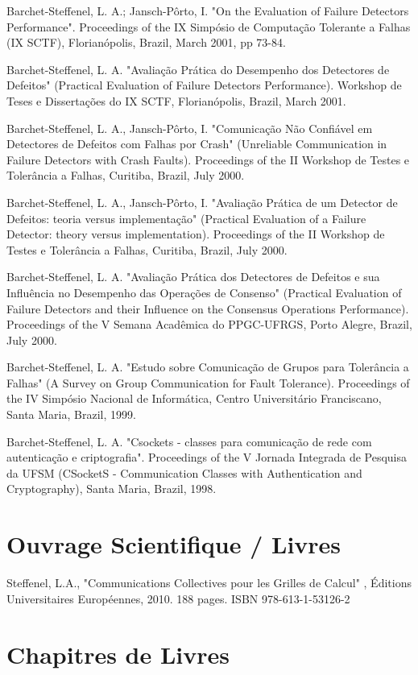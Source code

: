 \documentclass[final,twoside]{hdr} %
\begin{document}
Barchet-Steffenel, L. A.; Jansch-Pôrto, I. "On the Evaluation of Failure Detectors Performance". Proceedings of the IX Simpósio de Computação Tolerante a Falhas (IX SCTF), Florianópolis, Brazil, March 2001, pp 73-84.

Barchet-Steffenel, L. A. "Avaliação Prática do Desempenho dos Detectores de Defeitos" (Practical Evaluation of Failure Detectors Performance). Workshop de Teses e Dissertações do IX SCTF, Florianópolis, Brazil, March 2001. 

Barchet-Steffenel, L. A., Jansch-Pôrto, I. "Comunicação Não Confiável em Detectores de Defeitos com Falhas por Crash" (Unreliable Communication in Failure Detectors with Crash Faults). Proceedings of the II Workshop de Testes e Tolerância a Falhas, Curitiba, Brazil, July 2000. 

Barchet-Steffenel, L. A., Jansch-Pôrto, I. "Avaliação Prática de um Detector de Defeitos: teoria versus implementação" (Practical Evaluation of a Failure Detector: theory versus implementation). Proceedings of the II Workshop de Testes e Tolerância a Falhas, Curitiba, Brazil, July 2000. 

Barchet-Steffenel, L. A. "Avaliação Prática dos Detectores de Defeitos e sua Influência no Desempenho das Operações de Consenso" (Practical Evaluation of Failure Detectors and their Influence on the Consensus Operations Performance). Proceedings of the V Semana Acadêmica do PPGC-UFRGS, Porto Alegre, Brazil, July 2000. 

Barchet-Steffenel, L. A. "Estudo sobre Comunicação de Grupos para Tolerância a Falhas" (A Survey on Group Communication for Fault Tolerance). Proceedings of the IV Simpósio Nacional de Informática, Centro Universitário Franciscano, Santa Maria, Brazil, 1999. 

Barchet-Steffenel, L. A. "Csockets - classes para comunicação de rede com autenticação e criptografia". Proceedings of the V Jornada Integrada de Pesquisa da UFSM (CSocketS - Communication Classes with Authentication and Cryptography), Santa Maria, Brazil, 1998.

\section*{Ouvrage Scientifique / Livres}

Steffenel, L.A., "Communications Collectives pour les Grilles de Calcul" , Éditions Universitaires Européennes, 2010. 188 pages. ISBN 978-613-1-53126-2

\section*{Chapitres de Livres}
\end{document}
